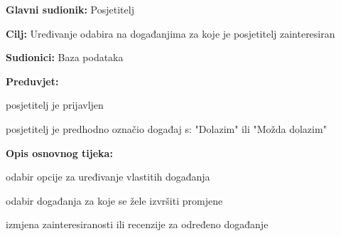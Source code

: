 					\noindent {}
					\begin{packed_item}
	
						\item \textbf{Glavni sudionik: }Posjetitelj
						\item  \textbf{Cilj:} Uređivanje odabira na događanjima za koje je posjetitelj zainteresiran
						\item  \textbf{Sudionici:} Baza podataka
						\item  \textbf{Preduvjet:}
						\item[] \begin{packed_item}
								
								\item  posjetitelj je prijavljen
								\item  posjetitelj je predhodno označio događaj s: "Dolazim" ili "Možda dolazim" 
								
								
							\end{packed_item} 
						\item  \textbf{Opis osnovnog tijeka:}
						
						\item[] \begin{packed_enum}
	
							\item odabir opcije za uređivanje vlastitih događanja
							\item odabir događanja za koje se žele izvršiti promjene
							\item izmjena zainteresiranosti ili recenzije za određeno događanje 
							
						\end{packed_enum}
						
					\end{packed_item}
					
